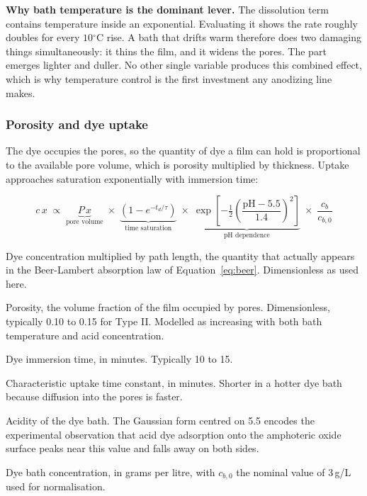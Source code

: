 \documentclass[11pt,a4paper]{article}
\newcommand{\degC}{\ensuremath{^\circ\mathrm{C}}}
\newenvironment{symlist}
  {\vspace{-0.2em}\begin{list}{}{%
    \setlength{\leftmargin}{2.4em}\setlength{\labelwidth}{2.0em}%
    \setlength{\labelsep}{0.4em}\setlength{\itemsep}{1pt}%
    \setlength{\parsep}{0pt}\setlength{\topsep}{3pt}%
    \renewcommand{\makelabel}[1]{##1\hfil}}}
  {\end{list}}
\begin{document}
\begin{keypoint}
\textbf{Why bath temperature is the dominant lever.} The dissolution term
contains temperature inside an exponential. Evaluating it shows the rate
roughly doubles for every $10\degC$ rise. A bath that drifts warm therefore
does two damaging things simultaneously: it thins the film, and it widens the
pores. The part emerges lighter and duller. No other single variable produces
this combined effect, which is why temperature control is the first investment
any anodizing line makes.
\end{keypoint}

\subsubsection{Porosity and dye uptake}

The dye occupies the pores, so the quantity of dye a film can hold is
proportional to the available pore volume, which is porosity multiplied by
thickness. Uptake approaches saturation exponentially with immersion time:

\begin{equation}
c\,x \;\propto\; \underbrace{P\,x}_{\text{pore volume}}
\;\times\; \underbrace{\left(1 - e^{-t_d/\tau}\right)}_{\text{time saturation}}
\;\times\; \underbrace{\exp\!\left[-\tfrac{1}{2}\left(\frac{\mathrm{pH} - 5.5}{1.4}\right)^{2}\right]}_{\text{pH dependence}}
\;\times\; \frac{c_b}{c_{b,0}}
\label{eq:dye}
\end{equation}

\begin{symlist}
\item[$c\,x$] Dye concentration multiplied by path length, the quantity that
actually appears in the Beer-Lambert absorption law of
Equation~\eqref{eq:beer}. Dimensionless as used here.
\item[$P$] Porosity, the volume fraction of the film occupied by pores.
Dimensionless, typically 0.10 to 0.15 for Type II. Modelled as increasing with
both bath temperature and acid concentration.
\item[$t_d$] Dye immersion time, in minutes. Typically 10 to 15.
\item[$\tau$] Characteristic uptake time constant, in minutes. Shorter in a
hotter dye bath because diffusion into the pores is faster.
\item[$\mathrm{pH}$] Acidity of the dye bath. The Gaussian form centred on 5.5
encodes the experimental observation that acid dye adsorption onto the
amphoteric oxide surface peaks near this value and falls away on both sides.
\item[$c_b$] Dye bath concentration, in grams per litre, with $c_{b,0}$ the
nominal value of 3\,g/L used for normalisation.
\end{symlist}
\end{document}
